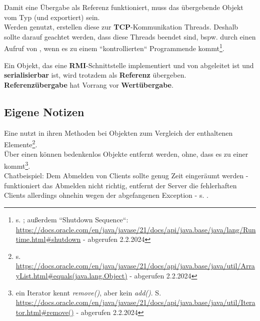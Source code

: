 \noindent
Damit eine Übergabe als Referenz funktioniert, muss das übergebende Objekt vom Typ  (und exportiert) sein.\\

\noindent
Werden  genutzt, erstellen diese zur \textbf{TCP}-Kommunikation Threads.
Deshalb sollte darauf geachtet werden, dass diese Threads beendet sind, bspw. durch einen Aufruf von , wenn es zu einem ``kontrollierten`` Programmende kommt\footnote{s. \cite[352]{Oec22}; außerdem ``Shutdown Sequence``: \url{https://docs.oracle.com/en/java/javase/21/docs/api/java.base/java/lang/Runtime.html#shutdown} - abgerufen 2.2.2024
}.\\

\begin{tcolorbox}
    \item Ein Objekt, das eine \textbf{RMI}-Schnittstelle implementiert und von  abgeleitet ist und \textbf{serialisierbar} ist, wird trotzdem als \textbf{Referenz} übergeben.\\

    \noindent
    \textbf{Referenzübergabe} hat Vorrang vor \textbf{Wertübergabe}.
\end{tcolorbox}

\subsection*{Eigene Notizen}

\noindent
Eine  nutzt in ihren Methoden bei Objekten  zum Vergleich der enthaltenen Elemente\footnote{
    s. \url{https://docs.oracle.com/en/java/javase/21/docs/api/java.base/java/util/ArrayList.html#equals(java.lang.Object)} - abgerufen 2.2.2024
}.\\

\noindent
Über einen  können bedenkenlos Objekte entfernt werden, ohne, dass es zu einer  kommt\footnote{ein Iterator kennt \textit{remove()}, aber kein \textit{add()}. S. \url{https://docs.oracle.com/en/java/javase/21/docs/api/java.base/java/util/Iterator.html#remove()} - abgerufen 2.2.2024}.\\


\noindent
Chatbeispiel: Dem Abmelden von Clients sollte genug Zeit eingeräumt werden - funktioniert das Abmelden nicht richtig, entfernt der Server die fehlerhaften Clients allerdings ohnehin wegen der abgefangenen Exception - s. \cite[345, Listing 6.22]{Oec22}.